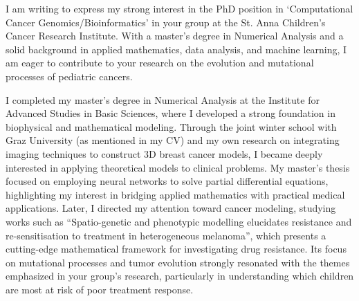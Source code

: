 


I am writing to express my strong interest in the PhD position in `Computational Cancer Genomics/Bioinformatics' in your group 
at the St. Anna Children’s Cancer Research Institute. 
With a master’s degree in Numerical Analysis and a solid background in applied mathematics, data analysis, and machine learning, 
I am eager to contribute to your research on the evolution and mutational processes of pediatric cancers.

I completed my master’s degree in Numerical Analysis at the Institute for Advanced Studies in Basic Sciences, 
where I developed a strong foundation in biophysical and mathematical modeling. 
Through the joint winter school with Graz University (as mentioned in my CV) and my own research on integrating imaging techniques to construct 3D breast cancer models, 
I became deeply interested in applying theoretical models to clinical problems. 
My master’s thesis focused on employing neural networks to solve partial differential equations, 
highlighting my interest in bridging applied mathematics with practical medical applications. 
Later, I directed my attention toward cancer modeling, 
studying works such as “Spatio-genetic and phenotypic modelling elucidates resistance and re-sensitisation to treatment in heterogeneous melanoma”, 
which presents a cutting-edge mathematical framework for investigating drug resistance. 
Its focus on mutational processes and tumor evolution strongly resonated with the themes emphasized in your group’s research, 
particularly in understanding which children are most at risk of poor treatment response.

